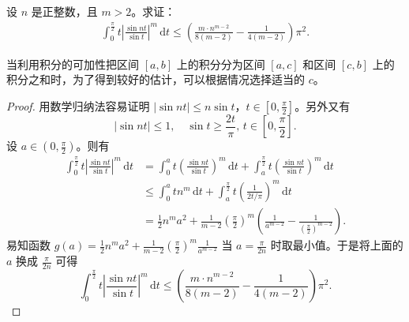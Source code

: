 \documentclass[../../main.tex]{subfiles}%
\begin{document}
\begin{example}
设 \( n \) 是正整数，且 \( m > 2 \)。求证：
\begin{align*}
\int_{0}^{\frac{\pi}{2}} t \left| \frac{\sin nt}{\sin t} \right|^m \, \mathrm{d}t \leqslant \left( \frac{m \cdot n^{m - 2}}{8(m - 2)} - \frac{1}{4(m - 2)} \right) \pi^2.
\end{align*}
\end{example}
\begin{remark}
当利用积分的可加性把区间 \( [a, b] \) 上的积分分为区间 \( [a, c] \) 和区间 \( [c, b] \) 上的积分之和时，为了得到较好的估计，可以根据情况选择适当的 \( c \)。
\end{remark}
\begin{proof}
用数学归纳法容易证明 \( |\sin nt| \leqslant n \sin t \)，\( t \in \left[ 0, \frac{\pi}{2} \right] \)。另外又有
\[
|\sin nt| \leqslant 1, \quad \sin t \geqslant \frac{2t}{\pi}, \, t \in \left[ 0, \frac{\pi}{2} \right].
\]
设 \( a \in \left( 0, \frac{\pi}{2} \right) \)。则有
\begin{align*}
\int_{0}^{\frac{\pi}{2}} t \left| \frac{\sin nt}{\sin t} \right|^m \, \mathrm{d}t &= \int_{0}^{a} t \left( \frac{\sin nt}{\sin t} \right)^m \, \mathrm{d}t + \int_{a}^{\frac{\pi}{2}} t \left( \frac{\sin nt}{\sin t} \right)^m \, \mathrm{d}t \\
&\leqslant \int_{0}^{a} tn^m \, \mathrm{d}t + \int_{a}^{\frac{\pi}{2}} t \left( \frac{1}{2t/\pi} \right)^m \, \mathrm{d}t \\
&= \frac{1}{2} n^m a^2 + \frac{1}{m - 2} \left( \frac{\pi}{2} \right)^m \left( \frac{1}{a^{m - 2}} - \frac{1}{(\frac{\pi}{2})^{m - 2}} \right).
\end{align*}
易知函数 \( g(a) = \frac{1}{2} n^m a^2 + \frac{1}{m - 2} \left( \frac{\pi}{2} \right)^m \frac{1}{a^{m - 2}} \) 当 \( a = \frac{\pi}{2n} \) 时取最小值。于是将上面的 \( a \) 换成 \( \frac{\pi}{2n} \) 可得
\[
\int_{0}^{\frac{\pi}{2}} t \left| \frac{\sin nt}{\sin t} \right|^m \, \mathrm{d}t \leqslant \left( \frac{m \cdot n^{m - 2}}{8(m - 2)} - \frac{1}{4(m - 2)} \right) \pi^2.
\]
\end{proof}
\end{document}
